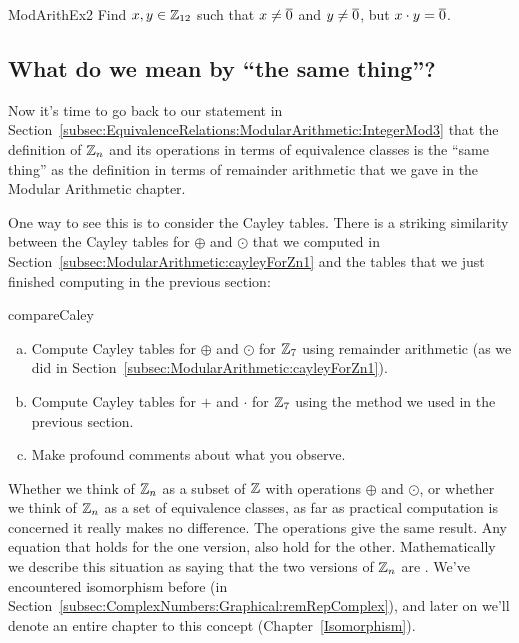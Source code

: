 \begin{exercise}{ModArithEx2}  
Find $x,y \in \mathbb{Z}_{12}$ such that $x \neq \overline{0}$ and $y \neq \overline{0}$, but $x \cdot y = \overline{0}$.
\end{exercise}

\subsection{What do we mean by ``the same thing''?}
\label{subsec:EquivalenceRelations:ModularArithmetic:theSameThing}

Now it's time to go back to our statement in Section~\ref{subsec:EquivalenceRelations:ModularArithmetic:IntegerMod3} that the definition of $\mathbb{Z}_n$ and its operations in terms of equivalence classes is the ``same thing'' as the definition in terms of remainder arithmetic that we gave in the Modular Arithmetic chapter.

One way to see this is to consider the Cayley tables. There is a striking similarity between the Cayley tables for $\oplus$ and $\odot$ that we computed in Section~\ref{subsec:ModularArithmetic:cayleyForZn1} and the tables that we just finished computing in the previous section:

\begin{exercise}{compareCaley}
\begin{enumerate}[(a)]
\item
Compute Cayley tables for $\oplus$ and $\odot$ for $\mathbb{Z}_7$ using remainder arithmetic (as we did in Section~\ref{subsec:ModularArithmetic:cayleyForZn1}).
\item
Compute Cayley tables for $+$ and $\cdot$ for $\mathbb{Z}_7$ using the method we used in the previous section.
\item
Make profound comments about what you observe.
\end{enumerate}
\end{exercise}

Whether we think of $\mathbb{Z}_n$ as a subset of $\mathbb{Z}$ with operations $\oplus$ and $\odot$, or whether we think of $\mathbb{Z}_n$ as a set of equivalence classes, as far as practical computation is concerned it really makes no difference. The operations give the same result. Any equation that holds for the one version, also hold for the other. Mathematically we describe this situation as saying that the two versions of $\mathbb{Z}_n$ are . We've encountered isomorphism before (in Section~\ref{subsec:ComplexNumbers:Graphical:remRepComplex}), and later on we'll denote an entire chapter to this concept (Chapter~\ref{Isomorphism}).

